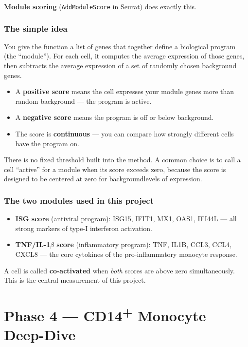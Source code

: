 \documentclass[11pt, a4paper]{article}
\begin{document}
\textbf{Module scoring} (\texttt{AddModuleScore} in Seurat) does exactly this.

\subsubsection*{The simple idea}

You give the function a list of genes that together define a biological program
(the ``module''). For each cell, it computes the average expression of those
genes, then subtracts the average expression of a set of randomly chosen
background genes.

\begin{itemize}[nosep]
  \item A \textbf{positive score} means the cell expresses your module genes
        more than random background — the program is active.
  \item A \textbf{negative score} means the program is off or below background.
  \item The score is \textbf{continuous} — you can compare how strongly
        different cells have the program on.
\end{itemize}

There is no fixed threshold built into the method.
A common choice is to call a cell ``active'' for a module when its score
exceeds zero, because the score is designed to be centered at zero for
backgroundlevels of expression.

\subsubsection*{The two modules used in this project}

\begin{itemize}[nosep]
  \item \textbf{ISG score} (antiviral program): ISG15, IFIT1, MX1, OAS1, IFI44L —
        all strong markers of type-I interferon activation.
  \item \textbf{TNF/IL-1$\beta$ score} (inflammatory program): TNF, IL1B, CCL3,
        CCL4, CXCL8 — the core cytokines of the pro-inflammatory monocyte response.
\end{itemize}

A cell is called \textbf{co-activated} when \textit{both} scores are above zero
simultaneously. This is the central measurement of this project.

\section{Phase 4 — CD14\textsuperscript{+} Monocyte Deep-Dive}
\end{document}
